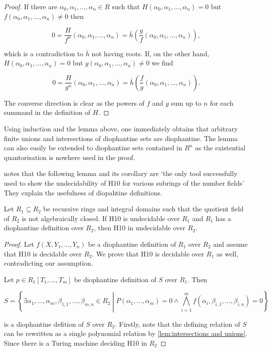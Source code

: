 \begin{proof}
If there are $α_0, α_1, …, α_n ∈ R$ such that
$H(α_0, α_1, …, α_n) = 0$ but $f(α_0, α_1, …, α_n) ≠ 0$ then

\[ 0 = \frac H {f^n} (α_0, α_1, …, α_n) = \bar h \left(\frac gf (α_0, α_1, …, α_n) \right), \]

which is a contradiction to $\bar h$ not having roots. If, on the
other hand, $H(α_0, α_1, …, α_n) = 0$ but $g(α_0, α_1, …, α_n) ≠ 0$
we find

\[ 0 = \frac H {g^n}(α_0, α_1, …, α_n) = \bar h \left( \frac fg (α_0, α_1, …, α_n) \right). \]

The converse direction is clear as the powers of $f$ and $g$ sum up
to $n$ for each summand in the definition of $H$.
\end{proof}

Using induction and the lemma above, one immediately obtains that
arbitrary finite unions and intersections of diophantine sets are
diophantine. The lemma can also easily be extended to diophantine sets
contained in $R^n$ as the existential quantorisation is nowhere used
in the proof.

\textcite{Shlapentokh2000} notes that the following lemma and its corollary are
`the only tool successfully used to show the undecidability of \textsc{H10}
for various subrings of the number fields' They explain the usefulness
of diopahtine definitions.

\begin{lem} \label{lem:moving up}
Let $R_1 \subseteq R_2$ be recursive rings and integral domains such
that the quotient field of $R_2$ is not algebraically closed. If H10
is undecidable over $R_1$ and $R_1$ has a diophantine definition over
$R_2$, then H10 in undecidable over $R_2$.
\end{lem}

\begin{proof}
Let $f(X, Y_1, …, Y_n)$ be a diophantine definition of $R_1$ over
$R_2$ and assume that H10 is decidable over $R_2$. We prove that H10
is decidable over $R_1$ as well, contradicting our assumption.

Let $p ∈ R_1[T_1, …, T_m]$ be diophantine definition of $S$ over
$R_1$. Then

\[ S = \left\lbrace ∃α_1,…,α_m, β_{1,1}, …, β_{m,n} ∈ R_2 \middle| P(α_1, …, α_m) = 0 ∧ \bigwedge_{i=1}^m f(α_i, β_{i,1},…,β_{i,n}) = 0 \right\rbrace\]

is a diophantine defition of $S$ over $R_2$. Firstly, note that the
defining relation of $S$ can be rewritten as a single polynomial
relation by \cref{lem:intersections and unions}. Since there is
a Turing machine deciding \textsc{H10} in $R_2$
\end{proof}
